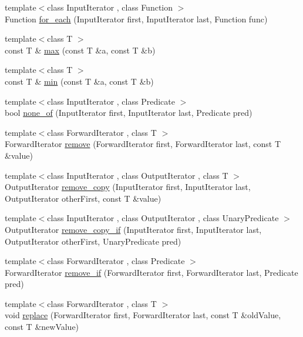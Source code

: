 \begin{DoxyCompactItemize}
\item 
{\footnotesize template$<$class Input\+Iterator , class Function $>$ }\\Function \hyperlink{namespaceprism_aae062d5bfdc0e53ae49c56520aded906}{for\+\_\+each} (Input\+Iterator first, Input\+Iterator last, Function func)
\item 
{\footnotesize template$<$class T $>$ }\\const T \& \hyperlink{namespaceprism_a812456273adfa37979e79f07e731d412}{max} (const T \&a, const T \&b)
\item 
{\footnotesize template$<$class T $>$ }\\const T \& \hyperlink{namespaceprism_a10aff0aca673fb1837069dd8967e4738}{min} (const T \&a, const T \&b)
\item 
{\footnotesize template$<$class Input\+Iterator , class Predicate $>$ }\\bool \hyperlink{namespaceprism_a10c83b433c7f98fd4513f1b68c6db594}{none\+\_\+of} (Input\+Iterator first, Input\+Iterator last, Predicate pred)
\item 
{\footnotesize template$<$class Forward\+Iterator , class T $>$ }\\Forward\+Iterator \hyperlink{namespaceprism_aeddd21943bcf811c56f7d9d1bd4784f6}{remove} (Forward\+Iterator first, Forward\+Iterator last, const T \&value)
\item 
{\footnotesize template$<$class Input\+Iterator , class Output\+Iterator , class T $>$ }\\Output\+Iterator \hyperlink{namespaceprism_ab7b6fb407340e51749169560b48fb20c}{remove\+\_\+copy} (Input\+Iterator first, Input\+Iterator last, Output\+Iterator other\+First, const T \&value)
\item 
{\footnotesize template$<$class Input\+Iterator , class Output\+Iterator , class Unary\+Predicate $>$ }\\Output\+Iterator \hyperlink{namespaceprism_abfc7da1f951e480a26d58fc098b78844}{remove\+\_\+copy\+\_\+if} (Input\+Iterator first, Input\+Iterator last, Output\+Iterator other\+First, Unary\+Predicate pred)
\item 
{\footnotesize template$<$class Forward\+Iterator , class Predicate $>$ }\\Forward\+Iterator \hyperlink{namespaceprism_a2e9d25191ed83ea0a193f16d9c0a00b7}{remove\+\_\+if} (Forward\+Iterator first, Forward\+Iterator last, Predicate pred)
\item 
{\footnotesize template$<$class Forward\+Iterator , class T $>$ }\\void \hyperlink{namespaceprism_a6156070b98de7130b8c912ae3a6d333f}{replace} (Forward\+Iterator first, Forward\+Iterator last, const T \&old\+Value, const T \&new\+Value)

\end{DoxyCompactItemize}

